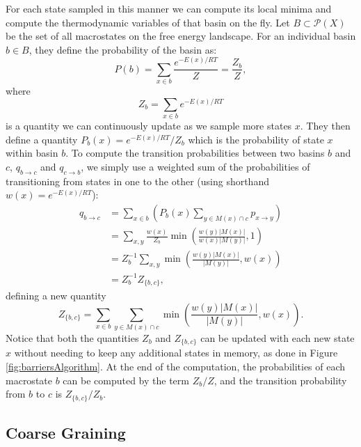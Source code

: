 For each state sampled in this manner we can compute its local minima
and compute the thermodynamic variables of that basin on the fly. Let
$B \subset \mathcal{P}(X)$ be the set of all macrostates on the free
energy landscape. For an individual basin $b \in B$, they define the
probability of the basin as:
\begin{equation}
P(b) = \sum_{x \in b} \frac{e^{-E(x)/RT}}{Z} = \frac{Z_b}{Z}, 
\end{equation}
where
\begin{equation}
Z_b = \sum_{x \in b} e^{-E(x)/RT}
\label{eq:Zb}
\end{equation}
is a quantity we can continuously update as we sample more states
$x$. They then define a quantity $P_b(x)=e^{-E(x)/RT}/Z_b$ which is the
probability of state $x$ within basin $b$.  To compute the transition
probabilities between two basins $b$ and $c$, $q_{b \to c}$ and $q_{c
  \to b}$, we simply use a weighted sum of the probabilities of
transitioning from states in one to the other (using shorthand
$w(x)=e^{-E(x)/RT}$):
\begin{equation}
\begin{split} 
q_{b \to c} &= \sum_{x \in b} \left ( P_b(x) \sum_{y \in M(x) \cap c} p_{x \to y} \right ) 
\\ & = \sum_{x,y} \frac{w(x)}{Z_b} \min \left (\frac{ w(y)  | M(x) |}{ w(x)  | M(y) |} , 1 \right )
\\ & = Z_b ^{-1}\sum_{x,y}  \min \left (\frac{ w(y)  | M(x) |}{| M(y) |} , w(x) \right )
\\ & = Z_b^{-1} Z_{\{b, c\}},
\end{split}
\end{equation}
defining a new quantity
\begin{equation}
Z_{\{b, c\}} = \sum_{x \in b} \sum_{y \in M(x) \cap c} \min \left ( \frac{w(y) |M(x)|}{|M(y)|}, w(x) \right ). 
\label{eq:Zbc} 
\end{equation}
Notice that both the quantities $Z_b$ and $Z_{\{b, c\}}$ can be
updated with each new state $x$ without needing to keep any additional
states in memory, as done in Figure \ref{fig:barriersAlgorithm}. At
the end of the computation, the probabilities of each macrostate $b$
can be computed by the term $Z_b/Z$, and the transition probability
from $b$ to $c$ is $Z_{\{b,c\}}/Z_b$.

\subsection{Coarse Graining}

